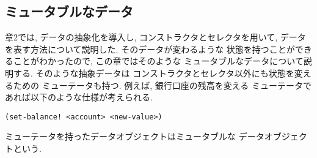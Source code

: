 \subsection{ミュータブルなデータ}
章2では, データの抽象化を導入し, コンストラクタとセレクタを用いて,
データを表す方法について説明した. そのデータが変わるような
状態を持つことができることがわかったので, この章ではそのような
ミュータブルなデータについて説明する. そのような抽象データは
コンストラクタとセレクタ以外にも状態を変えるための
ミューテータも持つ. 例えば, 銀行口座の残高を変える
ミューテータであれば以下のような仕様が考えられる.

\begin{lstlisting}[basicstyle=\footnotesize]
(set-balance! <account> <new-value>)
\end{lstlisting}

ミューテータを持ったデータオブジェクトはミュータブルな
データオブジェクトという.
%
